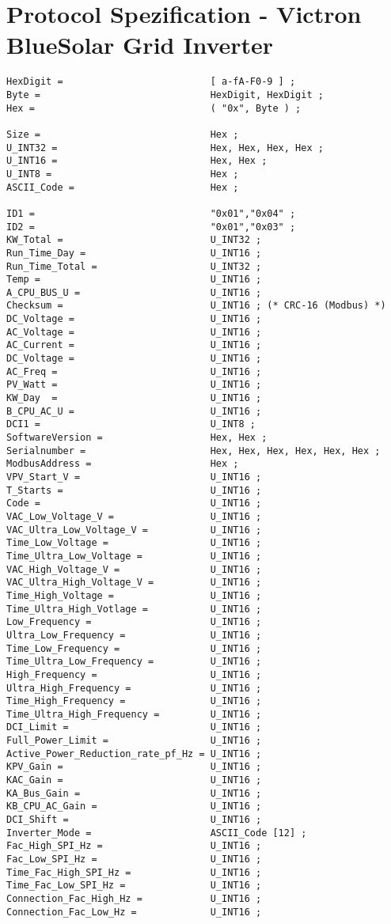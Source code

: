 \section{Protocol Spezification - Victron BlueSolar Grid Inverter}
\label{VICTRONBSINVEBNF}
\begin{verbatim}
HexDigit =                          [ a-fA-F0-9 ] ;
Byte =                              HexDigit, HexDigit ;
Hex =                               ( "0x", Byte ) ;

Size =                              Hex ;
U_INT32 =                           Hex, Hex, Hex, Hex ;
U_INT16 =                           Hex, Hex ;
U_INT8 =                            Hex ;
ASCII_Code =                        Hex ;

ID1 =                               "0x01","0x04" ;
ID2 =                               "0x01","0x03" ;
KW_Total =                          U_INT32 ;
Run_Time_Day =                      U_INT16 ;
Run_Time_Total =                    U_INT32 ;
Temp =                              U_INT16 ;
A_CPU_BUS_U =                       U_INT16 ;
Checksum =                          U_INT16 ; (* CRC-16 (Modbus) *)
DC_Voltage =                        U_INT16 ;
AC_Voltage =                        U_INT16 ;
AC_Current =                        U_INT16 ;
DC_Voltage =                        U_INT16 ;
AC_Freq =                           U_INT16 ;
PV_Watt =                           U_INT16 ;
KW_Day  =                           U_INT16 ;
B_CPU_AC_U =                        U_INT16 ;
DCI1 =                              U_INT8 ;
SoftwareVersion =                   Hex, Hex ;
Serialnumber =                      Hex, Hex, Hex, Hex, Hex, Hex ;
ModbusAddress =                     Hex ;
VPV_Start_V =                       U_INT16 ;
T_Starts =                          U_INT16 ;
Code =                              U_INT16 ;
VAC_Low_Voltage_V =                 U_INT16 ;
VAC_Ultra_Low_Voltage_V =           U_INT16 ;
Time_Low_Voltage =                  U_INT16 ; 
Time_Ultra_Low_Voltage =            U_INT16 ;
VAC_High_Voltage_V =                U_INT16 ;
VAC_Ultra_High_Voltage_V =          U_INT16 ;
Time_High_Voltage =                 U_INT16 ;
Time_Ultra_High_Votlage =           U_INT16 ;
Low_Frequency =                     U_INT16 ;
Ultra_Low_Frequency =               U_INT16 ;
Time_Low_Frequency =                U_INT16 ;
Time_Ultra_Low_Frequency =          U_INT16 ;
High_Frequency =                    U_INT16 ;
Ultra_High_Frequency =              U_INT16 ;
Time_High_Frequency =               U_INT16 ;
Time_Ultra_High_Frequency =         U_INT16 ;
DCI_Limit =                         U_INT16 ;
Full_Power_Limit =                  U_INT16 ;
Active_Power_Reduction_rate_pf_Hz = U_INT16 ;
KPV_Gain =                          U_INT16 ;
KAC_Gain =                          U_INT16 ;
KA_Bus_Gain =                       U_INT16 ;
KB_CPU_AC_Gain =                    U_INT16 ;
DCI_Shift =                         U_INT16 ;
Inverter_Mode =                     ASCII_Code [12] ;
Fac_High_SPI_Hz =                   U_INT16 ;
Fac_Low_SPI_Hz =                    U_INT16 ;
Time_Fac_High_SPI_Hz =              U_INT16 ;
Time_Fac_Low_SPI_Hz =               U_INT16 ;
Connection_Fac_High_Hz =            U_INT16 ;
Connection_Fac_Low_Hz =             U_INT16 ;


\end{verbatim}

